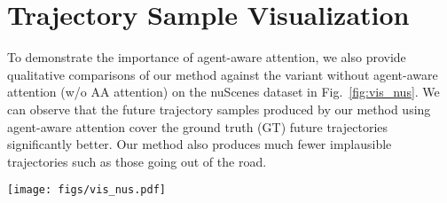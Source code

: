 \documentclass[10pt,twocolumn,letterpaper]{article}
\begin{document}
\section{Trajectory Sample Visualization}
 To demonstrate the importance of agent-aware attention, we also provide qualitative comparisons of our method against the variant without agent-aware attention (w/o AA attention) on the nuScenes dataset in Fig.~\ref{fig:vis_nus}. We can observe that the future trajectory samples produced by our method using agent-aware attention cover the ground truth (GT) future trajectories significantly better. Our method also produces much fewer implausible trajectories such as those going out of the road.

\begin{figure*}[h]
    \centering
    \texttt{[image: figs/vis\_nus.pdf]}
    \caption{\textbf{Trajectory Sample Visualization on nuScenes.} We compare our method against the variant without agent-aware attention (w/o AA attention). The future trajectory samples produced by our method using agent-aware attention cover the ground truth (GT) future trajectories significantly better. Our method also produces much fewer implausible trajectories such as those going out of the road.}
    \label{fig:vis_nus}
    \vspace{-2mm}
\end{figure*}
\end{document}
